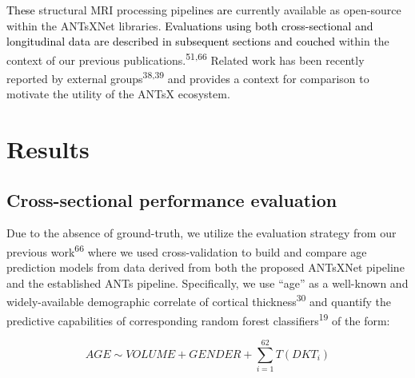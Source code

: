 \documentclass[
  12pt,
]{article}
\begin{document}
\textcolor{black}{These} structural MRI processing
pipeline\textcolor{black}{s
are} currently available as open-source within the ANTsXNet libraries.
\textcolor{black}{Evaluations using both cross-sectional and longitudinal data
are described in subsequent sections and couched} within the context of
our previous publications.\textsuperscript{51,66} Related work has been
recently reported by external groups\textsuperscript{38,39} and
provide\textcolor{black}{s} a context for comparison to motivate the
utility of the ANTsX ecosystem.

\hypertarget{results}{%
\section*{Results}\label{results}}

\hypertarget{cross-sectional-performance-evaluation}{%
\subsection*{Cross-sectional performance
evaluation}\label{cross-sectional-performance-evaluation}}



Due to the absence of ground-truth, we utilize the evaluation strategy
from our previous work\textsuperscript{66} where we used
cross-validation to build and compare age prediction models from data
derived from both the proposed ANTsXNet pipeline and the established
ANTs pipeline. Specifically, we use ``age'' as a well-known and
widely-available demographic correlate of cortical
thickness\textsuperscript{30} and quantify the predictive capabilities
of corresponding random forest classifiers\textsuperscript{19} of the
form:

\begin{equation}
AGE \sim VOLUME + GENDER + \sum_{i=1}^{62} T(DKT_i)
\end{equation}
\end{document}
